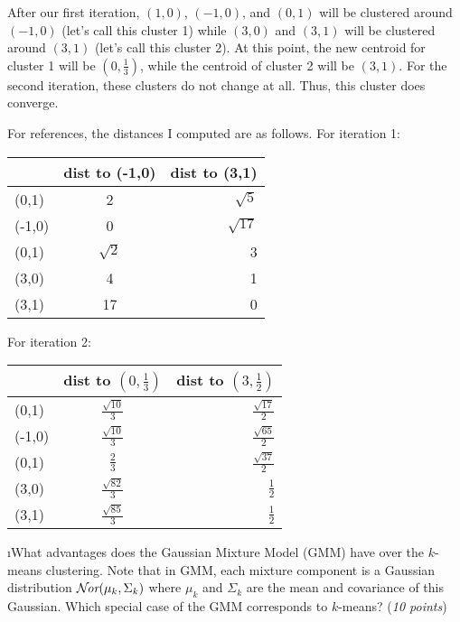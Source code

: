 \documentclass[fleqn]{article}
\begin{document}
\begin{solution}
After our first iteration, $(1,0)$, $(-1,0)$, and $(0,1)$ will be clustered around $(-1,0)$ (let's call this cluster 1) while $(3,0)$ and $(3,1)$  will be clustered around $(3,1)$ (let's call this cluster 2). At this point, the new centroid for cluster 1 will be $(0,\frac{1}{3})$, while the centroid of cluster 2 will be $(3,1)$. For the second iteration, these clusters do not change at all. Thus, this cluster does converge.

For references, the distances I computed are as follows. For iteration 1:

\begin{tabular}{ | l | c || r | }
  \hline                       
   & dist to (-1,0) & dist to (3,1) \\
  \hline                       
  (0,1) & 2 & $\sqrt{5}$ \\
  (-1,0) & 0 & $\sqrt{17}$ \\
  (0,1) & $\sqrt{2}$ & 3 \\
  (3,0) & 4 & 1 \\
  (3,1) & 17 & 0 \\
  \hline  
\end{tabular}

For iteration 2:

\begin{tabular}{ | l | c || r | }
  \hline                       
   & dist to $(0, \frac{1}{3})$ & dist to $(3,\frac{1}{2})$ \\
  \hline                       
  (0,1) & $\frac{\sqrt{10}}{3}$ & $\frac{\sqrt{17}}{2}$ \\
  (-1,0) & $\frac{\sqrt{10}}{3}$ & $\frac{\sqrt{65}}{2}$ \\
  (0,1) & $\frac{2}{3}$ & $\frac{\sqrt{37}}{2}$ \\
  (3,0) & $\frac{\sqrt{82}}{3}$ & $\frac{1}{2}$ \\
  (3,1) & $\frac{\sqrt{85}}{3}$ & $\frac{1}{2}$ \\
  \hline  
\end{tabular}
\end{solution}

\i What advantages does the Gaussian Mixture Model (GMM) have over
the $k$-means clustering. Note that in GMM, each mixture component is a 
Gaussian distribution $\mathcal{N}\hspace{-0.5mm}\textit{or}(\mu_k,\Sigma_k)$ where $\mu_k$ and $\Sigma_k$ 
are the mean and covariance of this Gaussian. Which special case of the 
GMM corresponds to $k$-means? (\textit{10 points})
\end{document}
